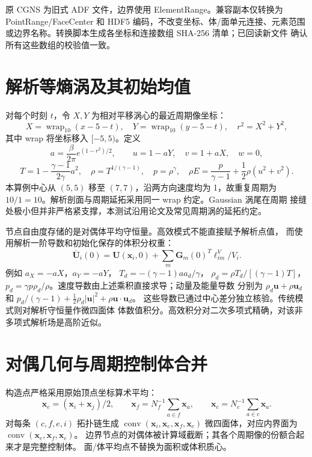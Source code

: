 \documentclass[UTF8,fontset=none,11pt,a4paper]{ctexart}
\begin{document}
原 CGNS 为旧式 ADF 文件，边界使用 ElementRange。兼容副本仅转换为
PointRange/FaceCenter 和 HDF5 编码，不改变坐标、体/面单元连接、元素范围
或边界名称。转换脚本生成各坐标和连接数组 SHA-256 清单；已回读新文件
确认所有这些数组的校验值一致。

\section{解析等熵涡及其初始均值}
对每个时刻 $t$，令 $X,Y$ 为相对平移涡心的最近周期像坐标：
\[
X=\operatorname{wrap}_{10}(x-5-t),\quad
Y=\operatorname{wrap}_{10}(y-5-t),\quad r^2=X^2+Y^2,
\]
其中 wrap 将坐标移入 $[-5,5)$。定义
\[
a=\frac{\beta}{2\pi}e^{(1-r^2)/2},\qquad
u=1-aY,\quad v=1+aX,\quad w=0,
\]
\[
T=1-\frac{\gamma-1}{2\gamma}a^2,\quad
\rho=T^{1/(\gamma-1)},\quad p=\rho^\gamma,\quad
\rho E=\frac{p}{\gamma-1}+\frac12\rho(u^2+v^2).
\]
本算例中心从 $(5,5)$ 移至 $(7,7)$，沿两方向速度均为 1，故重复周期为
$10/1=10$。解析剖面与周期延拓采用同一 wrap 约定。Gaussian 涡尾在周期
接缝处极小但并非严格紧支撑，本测试沿用论文及常见周期涡的延拓约定。

节点自由度存储的是对偶体平均守恒量。高效模式不能直接赋予解析点值，
而使用解析一阶导数和初始化保存的体积分权重：
\[
\overline{\boldsymbol U}_i(0)=\boldsymbol U(\boldsymbol x_i,0)
+\sum_m\boldsymbol G_m(0)^T\boldsymbol\ell_{im}^{V}/V_i.
\]
例如 $a_X=-aX$，$a_Y=-aY$，
$T_d=-(\gamma-1)a a_d/\gamma$，
$\rho_d=\rho T_d/[(\gamma-1)T]$，
$p_d=\gamma p\rho_d/\rho$。速度导数由上述乘积直接求导；动量及能量导数
分别为 $\rho_d\boldsymbol u+\rho\boldsymbol u_d$ 和
$p_d/(\gamma-1)+\frac12\rho_d|\boldsymbol u|^2+
\rho\boldsymbol u\cdot\boldsymbol u_d$。
这些导数已通过中心差分独立核验。传统模式则对解析守恒量作微四面体
体数值积分。高效积分对二次多项式精确，对该非多项式解析场是高阶近似。

\section{对偶几何与周期控制体合并}
构造点严格采用原始顶点坐标算术平均：
\[
\boldsymbol x_e=(\boldsymbol x_i+\boldsymbol x_j)/2,\qquad
\boldsymbol x_f=N_f^{-1}\sum_{a\in f}\boldsymbol x_a,\qquad
\boldsymbol x_c=N_c^{-1}\sum_{a\in c}\boldsymbol x_a.
\]
对每条 $(c,f,e,i)$ 拓扑链生成
$\operatorname{conv}(\boldsymbol x_i,\boldsymbol x_e,\boldsymbol x_f,\boldsymbol x_c)$
微四面体，对应内界面为
$\operatorname{conv}(\boldsymbol x_e,\boldsymbol x_f,\boldsymbol x_c)$。
边界节点的对偶体被计算域截断；其各个周期像的份额合起来才是完整控制体。
面/体平均点不替换为面积或体积质心。
\end{document}
